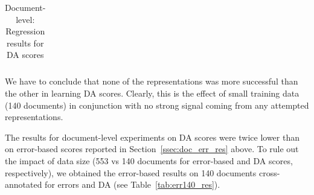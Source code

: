 \begin{table}[H]
\begin{tabular}{l|cl|cl}
		\bottomrule
	\end{tabular}
\caption{\label{tab:da_doc_res}Document-level: Regression results for DA scores}
\end{table}

We have to conclude that none of the representations was more successful than the other in learning DA scores. Clearly, this is the effect of small training data (140 documents) in conjunction with no strong signal coming from any attempted representations. 

The results for document-level experiments on DA scores were twice lower than on error-based scores reported in Section~\ref{ssec:doc_err_res} above. To rule out the impact of data size (553 vs 140 documents for error-based and DA scores, respectively), we obtained the error-based results on 140 documents cross-annotated for errors and DA (see Table~\ref{tab:err140_res}).

